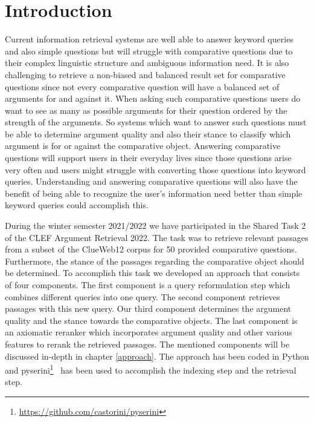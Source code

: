 \section{Introduction} \label{intro}
    Current information retrieval systems are well able to answer keyword queries and also simple questions but will struggle with comparative questions due to their complex linguistic structure and ambiguous information need.  It is also challenging to retrieve a non-biased and balanced result set for comparative questions since not every comparative question will have a balanced set of arguments for and against it. When asking such comparative questions users do want to see as many as possible arguments for their question ordered by the strength of the arguments. So systems which want to answer such questions must be able to determine argument quality and also their stance to classify which argument is for or against the comparative object.
    Answering comparative questions will support users in their everyday lives since those questions arise very often and users might struggle with converting those questions into keyword queries. Understanding and answering comparative questions will also have the benefit of being able to recognize the user's information need better than simple keyword queries could accomplish this. 
    \par
    During the winter semester 2021/2022 we have participated in the Shared Task 2 of the CLEF Argument Retrieval 2022. The task was to retrieve relevant passages from a subset of the ClueWeb12 corpus for 50 provided comparative questions. Furthermore, the stance of the passages regarding the comparative object should be determined. To accomplish this task we developed an approach that consists of four components. The first component is a query reformulation step which combines different queries into one query. The second component retrieves passages with this new query. Our third component determines the argument quality and the stance towards the comparative objects. The last component is an axiomatic reranker which incorporates argument quality and other various features to rerank the retrieved passages. The mentioned components will be discussed in-depth in chapter \ref{approach}. The approach has been coded in Python and pyserini\footnote{\url{https://github.com/castorini/pyserini}}~\cite{LinMLYPN2021} has been used to accomplish the indexing step and the retrieval step.   